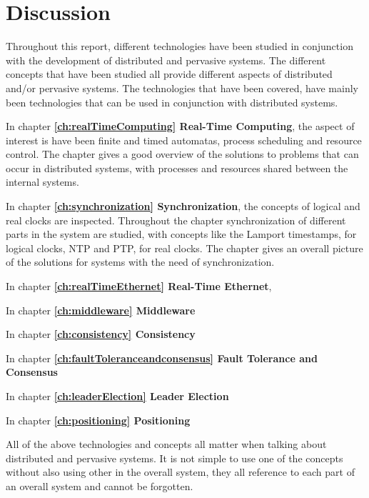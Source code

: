 \chapter{Discussion} \label{ch:discussion}
Throughout this report, different technologies have been studied in conjunction with the development of distributed and pervasive systems. The different concepts that have been studied all provide different aspects of distributed and/or pervasive systems. The technologies that have been covered, have mainly been technologies that can be used in conjunction with distributed systems.

In chapter \textbf{\ref{ch:realTimeComputing} Real-Time Computing}, the aspect of interest is have been finite and timed automatas, process scheduling and resource control. The chapter gives a good overview of the solutions to problems that can occur in distributed systems, with processes and resources shared between the internal systems.

In chapter \textbf{\ref{ch:synchronization} Synchronization}, the concepts of logical and real clocks are inspected. Throughout the chapter synchronization of different parts in the system are studied, with concepts like the Lamport timestamps, for logical clocks, NTP and PTP, for real clocks. The chapter gives an overall picture of the solutions for systems with the need of synchronization.

In chapter \textbf{\ref{ch:realTimeEthernet} Real-Time Ethernet}, 

In chapter \textbf{\ref{ch:middleware} Middleware}

In chapter \textbf{\ref{ch:consistency} Consistency}

In chapter \textbf{\ref{ch:faultToleranceandconsensus} Fault Tolerance and Consensus}

In chapter \textbf{\ref{ch:leaderElection} Leader Election}

In chapter \textbf{\ref{ch:positioning} Positioning}

All of the above technologies and concepts all matter when talking about distributed and pervasive systems. It is not simple to use one of the concepts without also using other in the overall system, they all reference to each part of an overall system and cannot be forgotten. 




